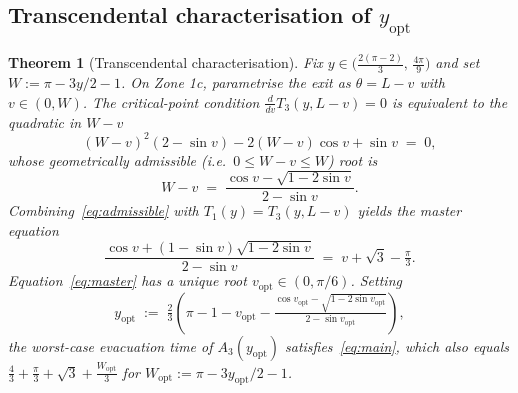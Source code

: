 \documentclass[11pt]{article}
\theoremstyle{plain}
\newtheorem{theorem}{Theorem}
\theoremstyle{definition}
\theoremstyle{remark}
\begin{document}
\subsection{Transcendental characterisation of $y_{\mathrm{opt}}$}
\label{sec:transcendental}

\begin{theorem}[Transcendental characterisation]
\label{thm:transcendental}
Fix $y \in \bigl(\tfrac{2(\pi-2)}{3},\, \tfrac{4\pi}{9}\bigr)$ and set
$W := \pi - 3y/2 - 1$. On Zone 1c, parametrise the exit as
$\theta = L - v$ with $v \in (0, W)$. The critical-point condition
$\tfrac{d}{dv} T_3(y, L - v) = 0$ is equivalent to the quadratic in
$W - v$
\begin{equation}
\label{eq:quadratic}
(W-v)^2 (2 - \sin v) - 2(W-v)\cos v + \sin v \;=\; 0,
\end{equation}
whose geometrically admissible (i.e.\ $0 \le W - v \le W$) root is
\begin{equation}
\label{eq:admissible}
W - v \;=\; \frac{\cos v - \sqrt{1 - 2\sin v}}{2 - \sin v}.
\end{equation}
Combining~\eqref{eq:admissible} with $T_1(y) = T_3(y, L - v)$ yields the
\emph{master equation}
\begin{equation}
\label{eq:master}
\frac{\cos v + (1 - \sin v)\sqrt{1 - 2\sin v}}{2 - \sin v}
\;=\; v + \sqrt 3 - \tfrac{\pi}{3}.
\end{equation}
Equation~\eqref{eq:master} has a unique root $v_{\mathrm{opt}} \in (0,
\pi/6)$. Setting
\begin{equation}
\label{eq:yopt}
y_{\mathrm{opt}} \;:=\;
\tfrac{2}{3}\!\left(\pi - 1 - v_{\mathrm{opt}}
  - \tfrac{\cos v_{\mathrm{opt}} - \sqrt{1 - 2\sin v_{\mathrm{opt}}}}
         {2 - \sin v_{\mathrm{opt}}}\right),
\end{equation}
the worst-case evacuation time of $A_3(y_{\mathrm{opt}})$
satisfies~\eqref{eq:main}, which also equals
$\tfrac{4}{3} + \tfrac{\pi}{3} + \sqrt 3 + \tfrac{W_{\mathrm{opt}}}{3}$ for
$W_{\mathrm{opt}} := \pi - 3 y_{\mathrm{opt}}/2 - 1$.
\end{theorem}
\end{document}
